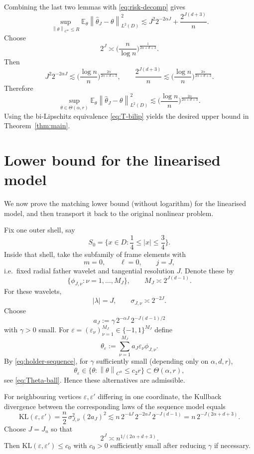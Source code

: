 \documentclass[11pt]{article}
\newcommand{\E}{\mathbb E}
\newcommand{\1}{\mathbf 1}
\newcommand{\norm}[1]{\left\|#1\right\|}
\begin{document}
Combining the last two lemmas with \eqref{eq:risk-decomp} gives
\[
\sup_{\norm{\theta}_{C^\alpha}\le R}
\E_\theta\norm{\widehat\theta_J-\theta}_{L^2(D)}^2
\lesssim
J^2 2^{-2\alpha J}+\frac{2^{J(d+3)}}{n}.
\]
Choose
\begin{equation}\label{eq:J-choice}
2^J\asymp \Big(\frac{n}{\log n}\Big)^{\frac1{2\alpha+d+3}}.
\end{equation}
Then
\[
J^2 2^{-2\alpha J}\lesssim
\Big(\frac{\log n}{n}\Big)^{\frac{2\alpha}{2\alpha+d+3}},
\qquad
\frac{2^{J(d+3)}}{n}
\lesssim
\Big(\frac{\log n}{n}\Big)^{\frac{2\alpha}{2\alpha+d+3}}.
\]
Therefore
\begin{equation}\label{eq:linear-upper}
\sup_{\theta\in\Theta(\alpha,r)}
\E_\theta\norm{\widehat\theta_J-\theta}_{L^2(D)}^2
\lesssim
\Big(\frac{\log n}{n}\Big)^{\frac{2\alpha}{2\alpha+d+3}}.
\end{equation}
Using the bi-Lipschitz equivalence \eqref{eq:T-bilip} yields the desired upper bound in Theorem~\ref{thm:main}.

\section{Lower bound for the linearised model}

We now prove the matching lower bound (without logarithm) for the linearised model, and then transport it back to the original nonlinear problem.

Fix one outer shell, say
\[
S_0=\Big\{x\in D:\frac14\le |x|\le \frac34\Big\}.
\]
Inside that shell, take the subfamily of frame elements with
\[
m=0,\qquad \ell=0,\qquad j=J,
\]
i.e.\ fixed radial father wavelet and tangential resolution $J$. Denote these by
\[
\{\phi_{J,\nu}:\nu=1,\dots,M_J\},
\qquad
M_J\asymp 2^{J(d-1)}.
\]
For these wavelets,
\[
|\lambda|=J,
\qquad
\sigma_{J,\nu}\asymp 2^{-2J}.
\]
Choose
\[
a_J:=\gamma\,2^{-\alpha J}\,2^{-J(d-1)/2}
\]
with $\gamma>0$ small. For $\varepsilon=(\varepsilon_\nu)_{\nu=1}^{M_J}\in\{-1,1\}^{M_J}$ define
\[
\theta_\varepsilon:=\sum_{\nu=1}^{M_J} a_J\varepsilon_\nu \phi_{J,\nu}.
\]
By \eqref{eq:holder-sequence}, for $\gamma$ sufficiently small (depending only on $\alpha,d,r$),
\[
\theta_\varepsilon\in \{\theta:\norm{\theta}_{C^\alpha}\le c_2 r\}\subset \Theta(\alpha,r),
\]
see \eqref{eq:Theta-ball}. Hence these alternatives are admissible.

For neighbouring vertices $\varepsilon,\varepsilon'$ differing in one coordinate, the Kullback divergence between the corresponding laws of the sequence model equals
\[
\mathrm{KL}(\varepsilon,\varepsilon')
=
\frac n2\,\sigma_{J,\nu}^2\,(2a_J)^2
\lesssim
n\,2^{-4J}\,2^{-2\alpha J}\,2^{-J(d-1)}
=
n\,2^{-J(2\alpha+d+3)}.
\]
Choose $J=J_n$ so that
\[
2^J\asymp n^{1/(2\alpha+d+3)}.
\]
Then $\mathrm{KL}(\varepsilon,\varepsilon')\le c_0$ with $c_0>0$ sufficiently small after reducing $\gamma$ if necessary.
\end{document}
